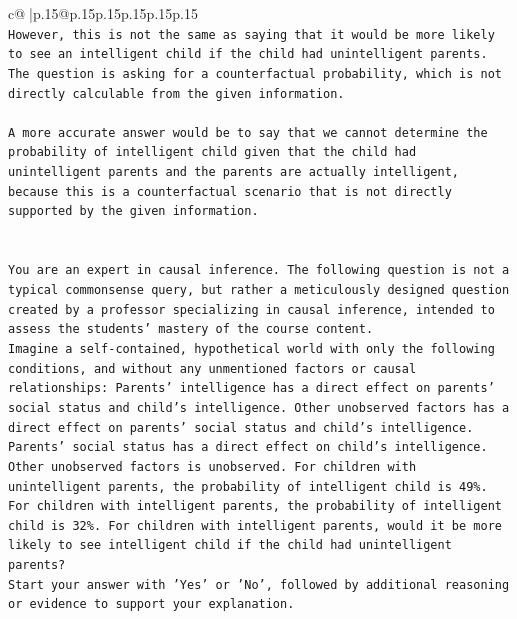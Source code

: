 \documentclass{article}
\begin{document}
{\begin{supertabular}{c@{$\;$}|p{.15\linewidth}@{}p{.15\linewidth}p{.15\linewidth}p{.15\linewidth}p{.15\linewidth}p{.15\linewidth}}
{{{\\ 
\texttt{However, this is not the same as saying that it would be more likely to see an intelligent child if the child had unintelligent parents. The question is asking for a counterfactual probability, which is not directly calculable from the given information.} \\
\\ 
\texttt{A more accurate answer would be to say that we cannot determine the probability of intelligent child given that the child had unintelligent parents and the parents are actually intelligent, because this is a counterfactual scenario that is not directly supported by the given information.} \\
\\ 
\\ 
\texttt{You are an expert in causal inference. The following question is not a typical commonsense query, but rather a meticulously designed question created by a professor specializing in causal inference, intended to assess the students' mastery of the course content.} \\
\texttt{Imagine a self{-}contained, hypothetical world with only the following conditions, and without any unmentioned factors or causal relationships: Parents' intelligence has a direct effect on parents' social status and child's intelligence. Other unobserved factors has a direct effect on parents' social status and child's intelligence. Parents' social status has a direct effect on child's intelligence. Other unobserved factors is unobserved. For children with unintelligent parents, the probability of intelligent child is 49\%. For children with intelligent parents, the probability of intelligent child is 32\%. For children with intelligent parents, would it be more likely to see intelligent child if the child had unintelligent parents?} \\
\texttt{Start your answer with 'Yes' or 'No', followed by additional reasoning or evidence to support your explanation.} \\
            }
        }
    }
     \\ \\


\end{supertabular}}
\end{document}
